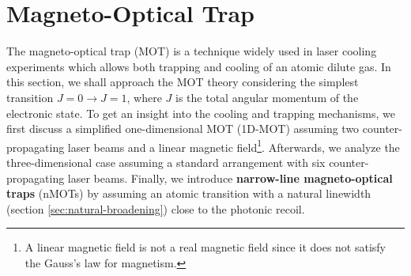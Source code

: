 %
\chapter{Magneto-Optical Trap}
\label{ch:MOT}
%

The magneto-optical trap (MOT) is a technique widely used in laser cooling experiments which allows both trapping and cooling of an atomic dilute gas. In this section, we shall approach the MOT theory \cite{krzysztof2010magneto, perrin2014doppler} considering the simplest transition $ J = 0 \rightarrow J = 1$, where $ J $ is the total angular momentum of the electronic state. To get an insight into the cooling and trapping mechanisms, we first discuss a simplified one-dimensional MOT (1D-MOT) assuming two counter-propagating laser beams and a linear magnetic field\footnote{A linear magnetic field is not a real magnetic field since it does not satisfy the Gauss's law for magnetism.}. Afterwards, we analyze the three-dimensional case assuming a standard arrangement with six counter-propagating laser beams. Finally, we introduce \textbf{narrow-line magneto-optical traps} (nMOTs) \cite{loftus2004narrow} by assuming an atomic transition with a natural linewidth (section \ref{sec:natural-broadening}) close to the photonic recoil.


%


%


%